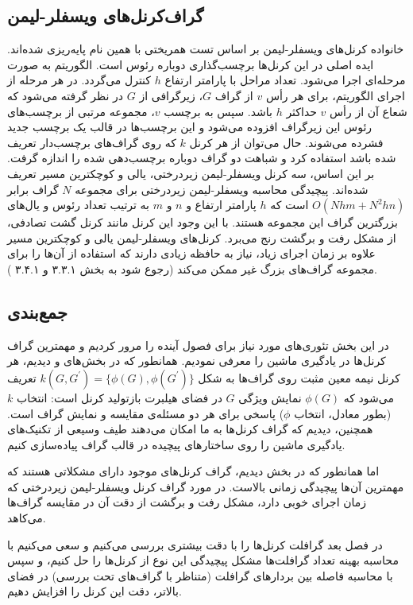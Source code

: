 \subsection{گراف‌کرنل‌های ویسفلر-لیمن}
 خانواده کرنل‌های ویسفلر-لیمن بر اساس تست همریختی با همین نام پایه‌ریزی شده‌اند. ایده اصلی در این کرنل‌ها برچسب‌گذاری دوباره رئوس است. الگوریتم به صورت مرحله‌ای اجرا می‌شود. تعداد مراحل با پارامتر ارتفاع $h$ کنترل می‌گردد. در هر مرحله از اجرای الگوریتم، برای هر رأس $v$ از گراف $G$، زیرگرافی از $G$ در نظر گرفته می‌شود که شعاع آن از رأس $v$ حداکثر $h$ باشد. سپس به برچسب $v$، مجموعه مرتبی از برچسب‌های رئوس این زیرگراف افزوده می‌شود و این برچسب‌ها در قالب یک برچسب جدید فشرده می‌شوند. حال می‌توان از هر کرنل $k$ که روی گراف‌های برچسب‌دار تعریف شده باشد استفاده کرد و شباهت دو گراف دوباره برچسب‌دهی شده را اندازه گرفت. بر این اساس، سه کرنل ویسفلر-لیمن زیردرختی، یالی و کوچکترین مسیر تعریف شده‌اند. پیچیدگی محاسبه ویسفلر-لیمن زیردرختی برای مجموعه $N$ گراف برابر  $O(Nhm+N^2hn)$ است که $h$ پارامتر ارتفاع و $n$ و $m$ به ترتیب تعداد رئوس و یال‌های بزرگترین گراف این مجموعه هستند. با این وجود این کرنل مانند کرنل گشت تصادفی، از مشکل رفت و برگشت رنج می‌برد. کرنل‌های ویسفلر-لیمن یالی و کوچکترین مسیر علاوه بر زمان اجرای زیاد، نیاز به حافظه زیادی دارند که استفاده از آن‌ها را برای مجموعه گراف‌های بزرگ غیر ممکن می‌کند (رجوع شود به بخش ۳.۳.۱ و ۳.۴.۱ ).
 
\subsection{جمع‌بندی}
در این بخش تئوری‌های مورد نیاز برای فصول آینده را مرور کردیم و مهمترین گراف کرنل‌ها در یادگیری ماشین را معرفی نمودیم. همانطور که در بخش‌های  و  دیدیم، هر کرنل نیمه معین مثبت روی گراف‌ها به شکل $k(G,G^\prime) = \lbrace{\phi(G),\phi(G^\prime)}\rbrace$ تعریف می‌شود که $\phi(G)$ نمایش ویژگی $G$ در فضای هیلبرت بازتولید کرنل است: انتخاب $k$ (بطور معادل، انتخاب $\phi$) پاسخی برای هر دو مسئله‌ی مقایسه و نمایش گراف است. همچنین، دیدیم که گراف کرنل‌ها به ما امکان می‌دهند طیف وسیعی از تکنیک‌های یادگیری ماشین را روی ساختارهای پیچیده در قالب گراف پیاده‌سازی کنیم.

اما همانطور که در بخش  دیدیم، گراف کرنل‌های موجود دارای مشکلاتی هستند که مهمترین آن‌ها پیچیدگی زمانی بالاست. در مورد گراف کرنل ویسفلر-لیمن زیردرختی که زمان اجرای خوبی دارد، مشکل رفت و برگشت از دقت آن در مقایسه گراف‌ها می‌کاهد.

در فصل بعد گرافلت کرنل‌ها را با دقت بیشتری بررسی می‌کنیم و سعی می‌کنیم با محاسبه بهینه تعداد گرافلت‌ها مشکل پیچیدگی این نوع از کرنل‌ها را حل کنیم، و سپس با محاسبه فاصله بین بردارهای گرافلت (متناظر با گراف‌های تحت بررسی) در فضای بالاتر، دقت این کرنل را افزایش دهیم.